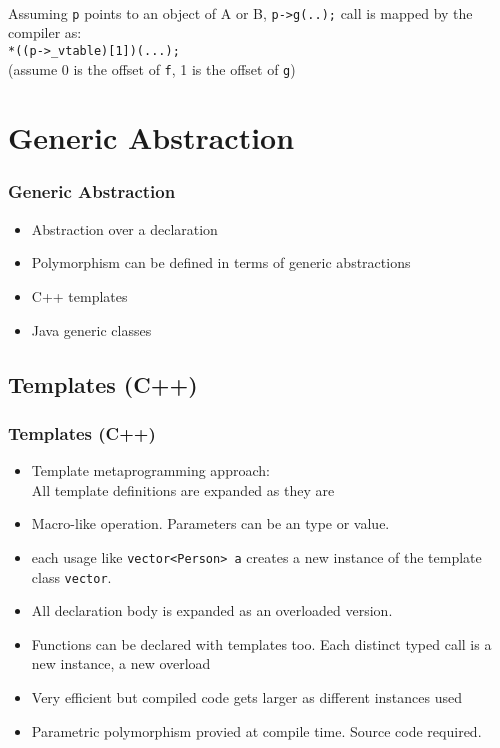 \begin{frame}
\ \\
Assuming \lstinline!p! points to an object of A or B, \lstinline!p->g(..);! call is mapped by the compiler as:\\
\lstinline!*((p->_vtable)[1])(...);! \\
(assume 0 is the offset of \lstinline!f!, 1 is the offset of \lstinline!g!)
\end{frame}

\section{Generic Abstraction}
\begin{frame}
\frametitle{Generic Abstraction}
\begin{itemize}
\item Abstraction over a declaration
\item Polymorphism can be defined in terms of generic abstractions
\item C++ templates
\item Java generic classes
\end{itemize}
\end{frame}

\subsection{Templates (C++)}
\begin{frame}
\frametitle{Templates (C++)}
\begin{itemize}
\item Template metaprogramming approach:\\
	All template definitions are expanded as they are 
\item Macro-like operation. Parameters can be an type or value.
\item each  usage like \lstinline!vector<Person> a!
	creates a new instance of the template class \lstinline!vector!.
\item All declaration body is expanded as an overloaded version.
\item Functions can be declared with templates too. Each distinct typed call is a new instance, a new overload
\item Very efficient but compiled code gets larger as different instances used
\item Parametric polymorphism provied at compile time. Source code required.
\end{itemize}
\end{frame}

